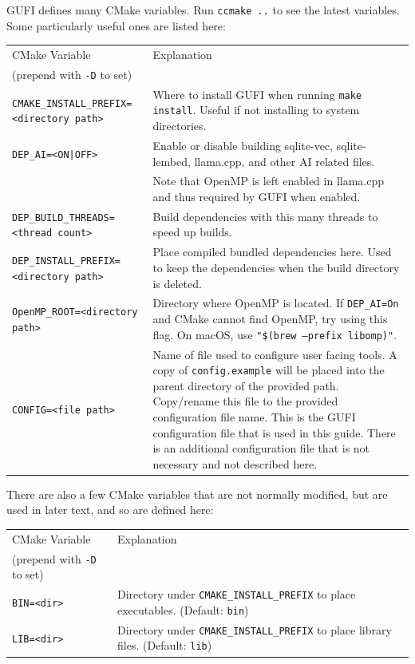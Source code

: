 GUFI defines many CMake variables. Run \texttt{ccmake ..} to see the latest variables.
Some particularly useful ones are listed here: \\
\begin{table}[H]
  \centering
  \begin{tabularx}{\textwidth}{| l | X |}
    \hline
    CMake Variable & Explanation \\
    (prepend with \texttt{-D} to set) & \\
    \hline
    \texttt{CMAKE\_INSTALL\_PREFIX=<directory path>} & Where to install
    GUFI when running \texttt{make install}. Useful if not installing to
    system directories. \\
    \hline
    \texttt{DEP\_AI=<ON|OFF>} & Enable or disable building sqlite-vec,
    sqlite-lembed, llama.cpp, and other AI related files. \\
    & Note that OpenMP is left enabled in llama.cpp and thus required
    by GUFI when enabled. \\
    \hline
    \texttt{DEP\_BUILD\_THREADS=<thread count>} & Build dependencies with
    this many threads to speed up builds. \\
    \hline
    \texttt{DEP\_INSTALL\_PREFIX=<directory path>} & Place compiled
    bundled dependencies here. Used to keep the dependencies when the
    build directory is deleted. \\
    \hline
    \texttt{OpenMP\_ROOT=<directory path>} & Directory where OpenMP is
    located. If \texttt{DEP\_AI=On} and CMake cannot find OpenMP, try
    using this flag. On macOS, use \texttt{"\$(brew --prefix libomp)"}. \\
    \hline
    \texttt{CONFIG=<file path>} & Name of file used to configure user
    facing tools. A copy of \texttt{config.example} will be placed
    into the parent directory of the provided path. Copy/rename this
    file to the provided configuration file name. This is the GUFI
    configuration file that is used in this guide. There is an
    additional configuration file that is not necessary and not
    described here. \\
    \hline
  \end{tabularx}
\end{table}

There are also a few CMake variables that are not normally modified,
but are used in later text, and so are defined here:

\begin{table}[H]
  \centering
  \begin{tabularx}{\textwidth}{| l | X |}
    \hline
    CMake Variable & Explanation \\
    (prepend with \texttt{-D} to set) & \\
    \hline
    \texttt{BIN=<dir>} & Directory under
    \texttt{CMAKE\_INSTALL\_PREFIX} to place executables. (Default:
    \texttt{bin}) \\
    \hline
    \texttt{LIB=<dir>} & Directory under
    \texttt{CMAKE\_INSTALL\_PREFIX} to place library files. (Default:
    \texttt{lib}) \\
    \hline
  \end{tabularx}
\end{table}

